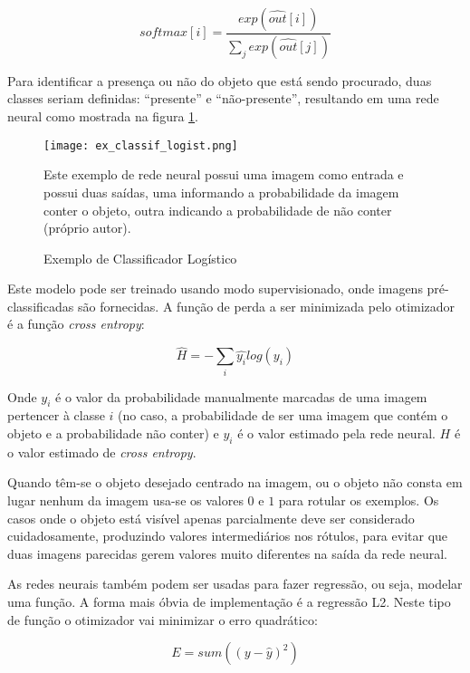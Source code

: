 \begin{equation}
	softmax[i] = \frac
		{exp\left( \widehat{out}[i] \right)}
		{\sum_j exp\left( \widehat{out}[j] \right)}
\end{equation}

Para identificar a presença ou não do objeto que está sendo procurado, duas
classes seriam definidas: ``presente'' e ``não-presente'', resultando em uma rede
neural como mostrada na figura \ref{fig:ex_classif_logist}.

\begin{figure}[!htb]
	\centering
	\texttt{[image: ex\_classif\_logist.png]}
	\caption{Exemplo de Classificador Logístico}
	\label{fig:ex_classif_logist}
	Este exemplo de rede neural possui uma imagem como entrada e possui duas
	saídas, uma informando a probabilidade da imagem conter o objeto, outra
	indicando a probabilidade de não conter (próprio autor).
\end{figure}

Este modelo pode ser treinado usando modo supervisionado, onde imagens
pré-classificadas são fornecidas. A função de perda a ser minimizada pelo
otimizador é a função \emph{cross entropy}:

\begin{equation}
	\widehat{H} = - \sum_i \widehat{y_i} log(y_i)
\end{equation}

Onde $y_i$ é o valor da probabilidade manualmente
marcadas de uma imagem pertencer à classe $i$ (no caso, a probabilidade de ser
uma imagem que contém o objeto e a probabilidade não conter) e $\widehat{y_i}$
é o valor estimado pela rede neural. $H$ é o valor estimado de
\emph{cross entropy}.

Quando têm-se o objeto desejado centrado na imagem, ou o objeto não consta
em lugar nenhum da imagem usa-se os valores $0$ e $1$ para rotular os exemplos.
Os casos onde o objeto está visível apenas parcialmente deve ser considerado
cuidadosamente, produzindo valores intermediários nos rótulos, para evitar que
duas imagens parecidas gerem valores muito diferentes na saída da rede neural.

As redes neurais também podem ser usadas para fazer regressão, ou seja, modelar
uma função. A forma mais óbvia de implementação é a regressão L2. Neste tipo de
função o otimizador vai minimizar o erro quadrático:

\begin{equation}
	E=sum \left( \left( y - \widehat{y} \right)^2 \right)
\end{equation}

